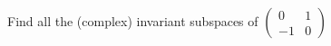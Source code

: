 \documentclass{amsart}
\begin{document}
	
\vspace{2em}

Find all the (complex) invariant subspaces of $\begin{pmatrix}
	0&1\\-1&0
	
\end{pmatrix}$
\end{document}
